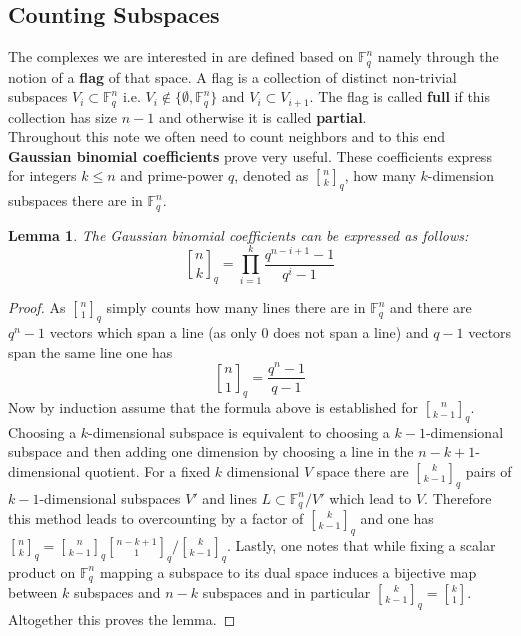 \documentclass[11pt]{amsart}
\newtheorem{lemma}[theorem]{Lemma}
\newcommand{\gBinom}{\genfrac{[}{]}{0pt}{}}
\begin{document}
    \subsection{Counting Subspaces}
    \label{sec:CountingSubspaces}
    The complexes we are interested in are defined based on $\mathbb{F}_q^n$ namely through the notion of a \textbf{flag} of that space. A  flag is a collection of distinct non-trivial subspaces $V_i\subset\mathbb{F}_q^n$ i.e. $V_i\not \in \{\emptyset,\mathbb{F}_q^n\}$ and $V_i\subset V_{i+1}$. The flag is called \textbf{full} if this collection has size $n-1$ and otherwise it is called \textbf{partial}.\\
	Throughout this note we often need to count neighbors and to this end \textbf{Gaussian binomial coefficients} prove very useful. These coefficients express for integers $k\leq n$ and prime-power $q$, denoted as $\gBinom{n}{k}_q$, how many $k$-dimension subspaces there are in $\mathbb{F}_q^n$. 
	\begin{lemma}
		The Gaussian binomial coefficients can be expressed as follows:
		\begin{equation}
			\gBinom{n}{k}_q=\prod_{i=1}^{k}\frac{q^{n-i+1}-1}{q^i-1}
		\end{equation}
		\label{lem:GaussBinom}
	\end{lemma}
	\begin{proof}
		As $\gBinom{n}{1}_q$ simply counts how many lines there are in $\mathbb{F}_q^n$ and there are $q^n-1$ vectors which span a line (as only $0$ does not span a line) and $q-1$ vectors span the same line one has
		\begin{equation}
			\gBinom{n}{1}_q=\frac{q^n-1}{q-1}
		\end{equation}
		Now by induction assume that the formula above is established for $\gBinom{n}{k-1}_q$. Choosing a $k$-dimensional subspace is equivalent to choosing a $k-1$-dimensional subspace and then adding one dimension by choosing a line in the $n-k+1$-dimensional quotient.  For a fixed $k$ dimensional $V$ space there are $\gBinom{k}{k-1}_q$ pairs of $k-1$-dimensional subspaces $V'$ and lines $L\subset \mathbb{F}_q^n/V'$ which lead to $V$. Therefore this method leads to overcounting by a factor of $\gBinom{k}{k-1}_q$ and one has $\gBinom{n}{k}_q=\gBinom{n}{k-1}_q\gBinom{n-k+1}{1}_q/\gBinom{k}{k-1}_q$. Lastly, one notes that while fixing a scalar product on $\mathbb{F}_q^n$ mapping a subspace to its dual space induces a bijective map between $k$ subspaces and $n-k$ subspaces and in particular $\gBinom{k}{k-1}_q=\gBinom{k}{1}$. Altogether this proves the lemma. 
	\end{proof}
\end{document}
